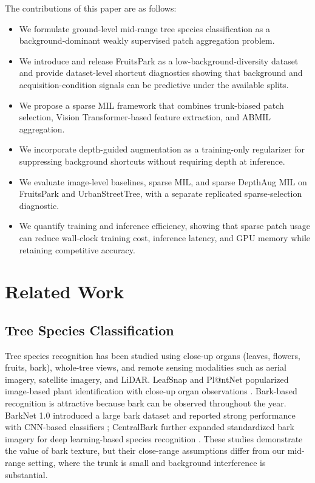 \documentclass{ieeeaccess}
\begin{document}
The contributions of this paper are as follows:
\begin{itemize}
\item We formulate ground-level mid-range tree species classification as a background-dominant
      weakly supervised patch aggregation problem.
\item We introduce and release FruitsPark as a low-background-diversity dataset and provide
      dataset-level shortcut diagnostics showing that background and acquisition-condition signals
      can be predictive under the available splits.
\item We propose a sparse MIL framework that combines trunk-biased patch selection, Vision
      Transformer-based feature extraction, and ABMIL aggregation.
\item We incorporate depth-guided augmentation as a training-only regularizer for suppressing
      background shortcuts without requiring depth at inference.
\item We evaluate image-level baselines, sparse MIL, and sparse DepthAug MIL on FruitsPark and
      UrbanStreetTree, with a separate replicated sparse-selection diagnostic.
\item We quantify training and inference efficiency, showing that sparse patch usage can reduce
      wall-clock training cost, inference latency, and GPU memory while retaining competitive
      accuracy.
\end{itemize}

\section{Related Work}
\label{sec:relatedwork}

\subsection{Tree Species Classification}
Tree species recognition has been studied using close-up organs (leaves, flowers, fruits, bark),
whole-tree views, and remote sensing modalities such as aerial imagery, satellite imagery, and
LiDAR. LeafSnap and Pl@ntNet popularized image-based plant identification with close-up organ
observations \cite{leafsnap,plantnet,plantnetlatest}. Bark-based recognition is attractive because
bark can be observed throughout the year. BarkNet 1.0 introduced a large bark dataset and reported
strong performance with CNN-based classifiers \cite{barknet}; CentralBark further expanded
standardized bark imagery for deep learning-based species recognition \cite{centralbark}. These
studies demonstrate the value of bark texture, but their close-range assumptions differ from our
mid-range setting, where the trunk is small and background interference is substantial.
\end{document}
